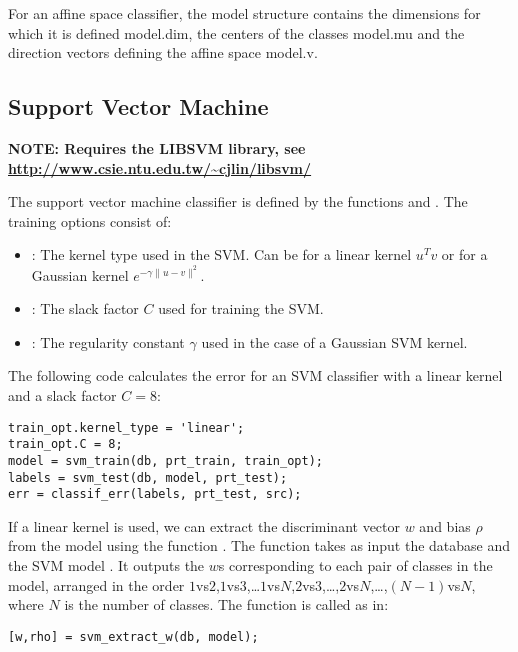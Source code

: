 \documentclass[twocolumn]{article}
\begin{document}
For an affine space classifier, the model structure contains the dimensions for which it is defined \mbox{model.dim}, the centers of the classes \mbox{model.mu} and the direction vectors defining the affine space \mbox{model.v}.

\subsection{Support Vector Machine}

\textbf{NOTE: Requires the LIBSVM library, see \url{http://www.csie.ntu.edu.tw/~cjlin/libsvm/}}

The support vector machine classifier is defined by the functions  and . The training options consist of:
\begin{itemize}
	\item {}: The kernel type used in the SVM. Can be  for a linear kernel $u^Tv$ or  for a Gaussian kernel $e^{-\gamma\|u-v\|^2}$.
	\item {}: The slack factor $C$ used for training the SVM.
	\item {}: The regularity constant $\gamma$ used in the case of a Gaussian SVM kernel.
\end{itemize}

The following code calculates the error for an SVM classifier with a linear kernel and a slack factor $C = 8$:
\begin{lstlisting}
train_opt.kernel_type = 'linear';
train_opt.C = 8;
model = svm_train(db, prt_train, train_opt);
labels = svm_test(db, model, prt_test);
err = classif_err(labels, prt_test, src);
\end{lstlisting}

If a linear kernel is used, we can extract the discriminant vector $w$ and bias $\rho$ from the model using the function . The function takes as input the database  and the SVM model . It outputs the $w$s corresponding to each pair of classes in the model, arranged in the order $1$vs$2$,$1$vs$3$,\ldots$1$vs$N$,$2$vs$3$,\ldots,$2$vs$N$,\ldots,$(N-1)$vs$N$, where $N$ is the number of classes. The function is called as in:
\begin{lstlisting}
[w,rho] = svm_extract_w(db, model);
\end{lstlisting}
\end{document}
